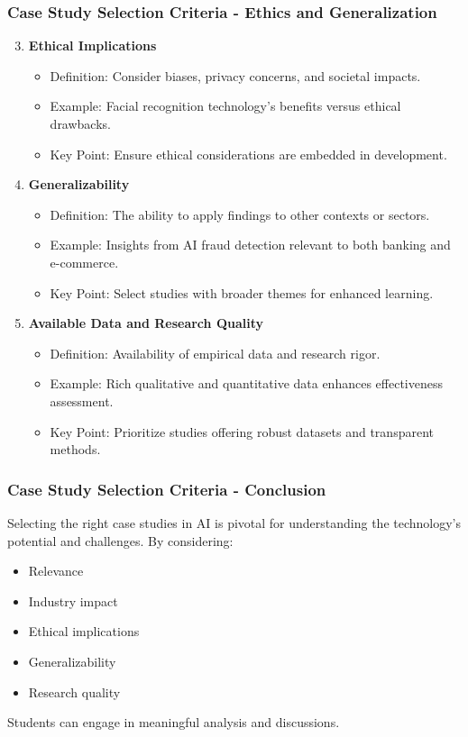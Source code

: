 \documentclass[aspectratio=169]{beamer}
\begin{document}
\begin{frame}[fragile]
    \frametitle{Case Study Selection Criteria - Ethics and Generalization}
    \begin{enumerate}
        \setcounter{enumi}{2}
        \item \textbf{Ethical Implications}
        \begin{itemize}
            \item Definition: Consider biases, privacy concerns, and societal impacts.
            \item Example: Facial recognition technology's benefits versus ethical drawbacks.
            \item Key Point: Ensure ethical considerations are embedded in development.
        \end{itemize}

        \item \textbf{Generalizability}
        \begin{itemize}
            \item Definition: The ability to apply findings to other contexts or sectors.
            \item Example: Insights from AI fraud detection relevant to both banking and e-commerce.
            \item Key Point: Select studies with broader themes for enhanced learning.
        \end{itemize}

        \item \textbf{Available Data and Research Quality}
        \begin{itemize}
            \item Definition: Availability of empirical data and research rigor.
            \item Example: Rich qualitative and quantitative data enhances effectiveness assessment.
            \item Key Point: Prioritize studies offering robust datasets and transparent methods.
        \end{itemize}
    \end{enumerate}
\end{frame}

\begin{frame}[fragile]
    \frametitle{Case Study Selection Criteria - Conclusion}
    Selecting the right case studies in AI is pivotal for understanding the technology's potential and challenges. By considering:
    \begin{itemize}
        \item Relevance
        \item Industry impact
        \item Ethical implications
        \item Generalizability
        \item Research quality
    \end{itemize}
    Students can engage in meaningful analysis and discussions.
\end{frame}
\end{document}
